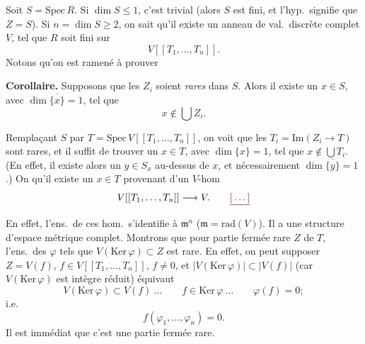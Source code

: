 \documentclass[11pt,a4paper]{article}
\begin{document}
Soit $S = \mathrm{Spec}\,R$. Si $\dim S \leqslant 1$, c'est trivial (alors
 $S$ est fini, et l'hyp.\ signifie
que $Z = S$). Si $n = \dim S \geqslant 2$, on sait qu'il existe un anneau de
val.\ discrète complet $V$,  tel que $R$ soit fini sur
\[
  V[[T_1, \ldots, T_n]] .
\]
Notons qu'on est ramené  à prouver

\textbf{Corollaire.} Supposons que les $Z_i$ soient \emph{rares} dans $S$.
Alors il existe un $x \in S$, avec $\dim \overline{\{x\}} = 1$, tel que
\[
  x \notin \bigcup Z_i .
\]

Remplaçant $S$ par $T = \mathrm{Spec}\,V[[T_1, \ldots, T_n]]$,
\struck{\ill{}} on voit que les $T_i = \mathrm{Im}(Z_i \to T)$ sont
rares, et il suffit de trouver un $x \in T$, avec
$\dim \overline{\{x\}} = 1$, tel que $x \notin \bigcup T_i$. (En effet, il
existe alors un $y \in S_x$ au-dessus de $x$, et \ill{}
nécessairement $\dim \overline{\{y\}} = 1$.) On 
qu'il existe \struck{\ill{}} un $x \in T$ provenant
d'un $V$-hom
\[
  V[[T_1, \ldots, T_n]] \longrightarrow V . \qquad \struck{\ill{}}
\]
En effet, l'ens.\ de ces hom.\ s'identifie à $\mathfrak{m}^n$
($\mathfrak{m} = \mathrm{rad}(V)$). Il a une structure d'espace
métrique \struck{\ill{}} complet. Montrons que pour
\struck{\ill{}} partie fermée rare $Z$ de $T$, l'ens.\ des $\varphi$ tels que
$V(\mathrm{Ker}\,\varphi) \subset Z$ est rare. En effet, on peut supposer
 $Z = V(f)$,
$f \in V[[T_1, \ldots, T_n]]$, $f \neq 0$, et
$|V(\mathrm{Ker}\,\varphi)| \subset |V(f)|$ (car
$V(\mathrm{Ker}\,\varphi)$ est intègre  réduit)
équivaut
\[
  V(\mathrm{Ker}\,\varphi) \subset V(f) \ \ldots \qquad
  f \in \mathrm{Ker}\,\varphi \ \ldots \qquad \varphi(f) = 0 ;
\]
i.e.
\[
  f(\varphi_1, \ldots, \varphi_n) = 0 .
\]
Il est immédiat que c'est une partie fermée rare.
\end{document}

